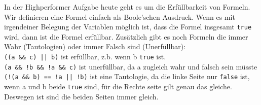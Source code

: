 \documentclass{../../sheet}
\begin{document}
\newpage
{}
In der Highperformer Aufgabe heute geht es um die Erfüllbarkeit von Formeln. Wir definieren eine Formel einfach als Boole'schen Ausdruck. Wenn es mit irgendeiner Belegung der Variablen möglich ist, dass die Formel insgesamt \texttt{true} wird, dann ist die Formel erfüllbar. Zusätzlich gibt es noch Formeln die immer Wahr (Tautologien) oder immer Falsch sind (Unerfüllbar):\\
\texttt{((a \&\& c) || b)} ist erfüllbar, z.b. wenn b \texttt{true} ist.\\
\texttt{(a \&\& !b \&\& !a \&\& c)} ist unerfüllbar, da a zugleich wahr und falsch sein müsste\\
\texttt{(!(a \&\& b) == !a || !b)} ist eine Tautologie, da die linke Seite nur \texttt{false} ist, wenn a und b beide \texttt{true} sind, für die Rechte seite gilt genau das gleiche. Deswegen ist sind die beiden Seiten immer gleich. 
\end{document}
